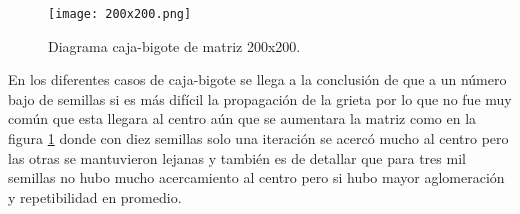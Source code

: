 \documentclass[a4paper, 11pt]{article}
\begin{document}
\begin{figure}[H]
  \centering      
  \texttt{[image: 200x200.png]}
  \caption{Diagrama caja-bigote de matriz 200x200.}
  \label{f4}
\end{figure}
\bigskip

En los diferentes casos de caja-bigote se llega a la conclusión de que a un número bajo de semillas si es más difícil la propagación de la grieta por lo que no fue muy común que esta llegara al centro aún que se aumentara la matriz como en la figura \ref{f4} donde con diez semillas solo una iteración se acercó mucho al centro pero las otras se mantuvieron lejanas y también es de detallar que para tres mil semillas no hubo mucho acercamiento al centro pero si hubo mayor aglomeración y repetibilidad en promedio.




\end{document}
